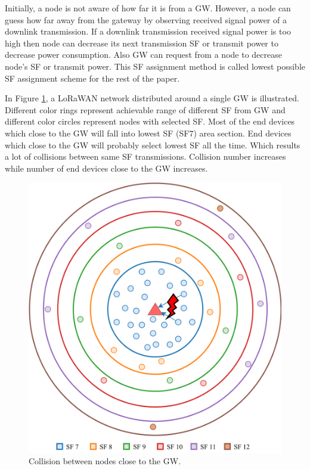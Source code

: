 \documentclass[conference]{IEEEtran}
\begin{document}
\par Initially, a node is not aware of how far it is from a GW. However, a node can guess how far away from the gateway by observing received signal power of a downlink transmission. If a downlink transmission received signal power is too high then node can decrease its next transmission SF or transmit power to decrease power consumption. Also GW can request from a node to decrease node's SF or transmit power. This SF assignment method is called lowest possible SF assignment scheme for the rest of the paper.

\par In Figure \ref{fig:collision}, a LoRaWAN network distributed around a single GW is illustrated. Different color rings represent achievable range of different SF from GW and different color circles represent nodes with selected SF. Most of the end devices which close to the GW will fall into lowest SF (SF7) area section. End devices which close to the GW will probably select lowest SF all the time. Which results a lot of collisions between same SF transmissions. Collision number increases while number of end devices close to the GW increases.

\begin{figure}
\centering
\includegraphics[width=\linewidth]{collision}
\caption{Collision between nodes close to the GW.}
\label{fig:collision}
\end{figure}
\end{document}
